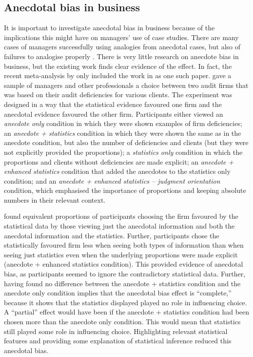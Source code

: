 \documentclass[a4paper, nobind, dvipsnames]{templates/ociamthesis}
\theoremstyle{definition}
\theoremstyle{definition}
\theoremstyle{definition}
\theoremstyle{definition}
\theoremstyle{remark}
\begin{document}
\subsection{Anecdotal bias in business}

It is important to investigate anecdotal bias in business because of the
implications this might have on managers' use of case studies. There are many
cases of managers successfully using analogies from anecdotal cases, but also of
failures to analogise properly \autocite{gavetti2005,gavetti2005a}. There is very
little research on anecdote bias in business, but the existing work finds clear
evidence of the effect. In fact, the recent meta-analysis by \textcite{freling2020} only
included the work in \textcite{wainberg2013} as one such paper. \textcite{wainberg2013} gave a
sample of managers and other professionals a choice between two audit firms that
was based on their audit deficiencies for various clients. The experiment was
designed in a way that the statistical evidence favoured one firm and the
anecdotal evidence favoured the other firm. Participants either viewed an
\emph{anecdote only} condition in which they were shown examples of firm
deficiencies; an \emph{anecdote + statistics} condition in which they were shown the
same as in the anecdote condition, but also the number of deficiencies and
clients (but they were not explicitly provided the proportions); a \emph{statistics
only} condition in which the proportions and clients without deficiencies are
made explicit; an \emph{anecdote + enhanced statistics} condition that added the
anecdotes to the statistics only condition; and an \emph{anecdote + enhanced
statistics -- judgment orientation} condition, which emphasised the importance of
proportions and keeping absolute numbers in their relevant context.

\textcite{wainberg2013} found equivalent proportions of participants choosing the firm
favoured by the statistical data by those viewing just the anecdotal information
and both the anecdotal information and the statistics. Further, participants
chose the statistically favoured firm less when seeing both types of information
than when seeing just statistics even when the underlying proportions were made
explicit (anecdote + enhanced statistics condition). This provided evidence of
anecdotal bias, as participants seemed to ignore the contradictory statistical
data. Further, having found no difference between the anecdote + statistics
condition and the anecdote only condition implies that the anecdotal bias effect
is ``complete,'' because it shows that the statistics displayed played no role in
influencing choice. A ``partial'' effect would have been if the anecdote +
statistics condition had been chosen more than the anecdote only condition. This
would mean that statistics still played some role in influencing choice.
Highlighting relevant statistical features and providing some explanation of
statistical inference reduced this anecdotal bias.
\end{document}
